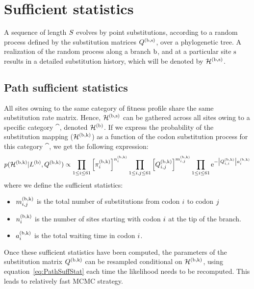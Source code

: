 \section{Sufficient statistics}
\label{sec:sufficient-statistics-mutselne}

A sequence of length $S$ evolves by point substitutions, according to a random process defined by the substitution matrices $Q^{(\text{b}, \text{s})}$, over a phylogenetic tree.
A realization of the random process along a branch $\text{b}$, and at a particular site $\text{s}$ results in a detailed substitution history, which will be denoted by $\mathcal{H}^{(\text{b}, \text{s})}$.

\subsection{Path sufficient statistics}
All sites owning to the same category of fitness profile share the same substitution rate matrix.
Hence, $\mathcal{H}^{(\text{b}, \text{s})}$ can be gathered across all sites owing to a specific category $\cat$, denoted $\mathcal{H}^{(\text{b})}$.
If we express the probability of the substitution mapping ($\mathcal{H}^{(\text{b}, \text{k})}$) as a function of the codon substitution process for this category $\cat$, we get the following expression:
\begin{equation}
    \label{eq:PathSuffStat}
    p(\mathcal{H}^{(\text{b}, \text{k})} | L^{(\text{b})}, Q^{(\text{b}, \text{k})}) \propto \prod_{1 \leq {i} \leq 61} \left[\pi_{{i}}^{(\text{b}, \text{k})}\right]^{n_{{i}}^{(\text{b}, \text{k})}} \prod_{ 1 \leq {i}, {j} \leq 61} \left[Q^{(\text{b}, \text{k})}_{{i}, {j}}\right]^{m_{{i}, {j}}^{(\text{b}, \text{k})}} \prod_{1 \leq {i} \leq 61} \mathrm{e}^{- \left| Q^{(\text{b}, \text{k})}_{{i}, {i}}\right| a_{{i}}^{(\text{b}, \text{k})}}
\end{equation}
where we define the sufficient statistics:
\begin{itemize}
    \setlength\itemsep{-0.25em}
    \item $m_{{i}, {j}}^{(\text{b}, \text{k})}$ is the total number of substitutions from codon ${i}$ to codon ${j}$
    \item $n_{{i}}^{(\text{b}, \text{k})}$ is the number of sites starting with codon ${i}$ at the tip of the branch.
    \item $a_{{i}}^{(\text{b}, \text{k})}$ is the total waiting time in codon ${i}$.
\end{itemize}
Once these sufficient statistics have been computed, the parameters of the substitution matrix $Q^{(\text{b}, \text{k})}$ can be resampled conditional on $\mathcal{H}^{(\text{b}, \text{k})}$,
using equation~\ref{eq:PathSuffStat} each time the likelihood needs to be recomputed. This leads to relatively fast \acrshort{MCMC} strategy.

